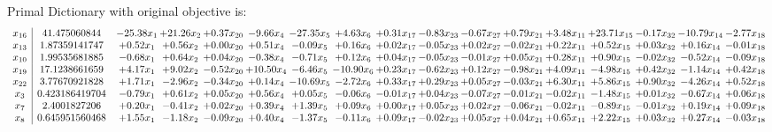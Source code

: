 \documentclass[9pt]{article}
\begin{document}
Primal Dictionary with original objective is:
\[\begin{array}{c| c c@{\hskip 2pt} c@{\hskip 2pt} c@{\hskip 2pt} c@{\hskip 2pt} c@{\hskip 2pt} c@{\hskip 2pt} c@{\hskip 2pt} c@{\hskip 2pt} c@{\hskip 2pt} c@{\hskip 2pt} c@{\hskip 2pt} c@{\hskip 2pt} c@{\hskip 2pt} c@{\hskip 2pt} c@{\hskip 2pt} }
 x_{16}   &  41.475060844 & -25.38 x_{1} & + 21.26 x_{2} & +  0.37 x_{20} & -9.66 x_{4} & -27.35 x_{5} & +  4.63 x_{6} & +  0.31 x_{17} & -0.83 x_{23} & -0.67 x_{27} & +  0.79 x_{21} & +  3.48 x_{11} & + 23.71 x_{15} & -0.17 x_{32} & -10.79 x_{14} & -2.77 x_{18}\\
 x_{13}   &  1.87359141747 & +  0.52 x_{1} & +  0.56 x_{2} & +  0.00 x_{20} & +  0.51 x_{4} & -0.09 x_{5} & +  0.16 x_{6} & +  0.02 x_{17} & -0.05 x_{23} & +  0.02 x_{27} & -0.02 x_{21} & +  0.22 x_{11} & +  0.52 x_{15} & +  0.03 x_{32} & +  0.16 x_{14} & -0.01 x_{18}\\
 x_{10}   &  1.99535681885 & -0.68 x_{1} & +  0.64 x_{2} & +  0.04 x_{20} & -0.38 x_{4} & -0.71 x_{5} & +  0.12 x_{6} & +  0.04 x_{17} & -0.05 x_{23} & -0.01 x_{27} & +  0.05 x_{21} & +  0.28 x_{11} & +  0.90 x_{15} & -0.02 x_{32} & -0.52 x_{14} & -0.09 x_{18}\\
 x_{19}   &  17.1238661659 & +  4.17 x_{1} & +  9.02 x_{2} & -0.52 x_{20} & + 10.50 x_{4} & -6.46 x_{5} & -10.90 x_{6} & +  0.23 x_{17} & -0.62 x_{23} & +  0.12 x_{27} & -0.98 x_{21} & +  4.09 x_{11} & -4.98 x_{15} & +  0.42 x_{32} & -1.14 x_{14} & +  0.42 x_{18}\\
 x_{22}   &  3.77670921828 & +  1.71 x_{1} & -2.96 x_{2} & -0.34 x_{20} & +  0.14 x_{4} & -10.69 x_{5} & -2.72 x_{6} & +  0.33 x_{17} & +  0.29 x_{23} & +  0.05 x_{27} & -0.03 x_{21} & +  6.30 x_{11} & +  5.86 x_{15} & +  0.90 x_{32} & -4.26 x_{14} & +  0.52 x_{18}\\
 x_{3}   &  0.423186419704 & -0.79 x_{1} & +  0.61 x_{2} & +  0.05 x_{20} & +  0.56 x_{4} & +  0.05 x_{5} & -0.06 x_{6} & -0.01 x_{17} & +  0.04 x_{23} & -0.07 x_{27} & -0.01 x_{21} & -0.02 x_{11} & -1.48 x_{15} & +  0.01 x_{32} & -0.67 x_{14} & +  0.06 x_{18}\\
 x_{7}   &  2.4001827206 & +  0.20 x_{1} & -0.41 x_{2} & +  0.02 x_{20} & +  0.39 x_{4} & +  1.39 x_{5} & +  0.09 x_{6} & +  0.00 x_{17} & +  0.05 x_{23} & +  0.02 x_{27} & -0.06 x_{21} & -0.02 x_{11} & -0.89 x_{15} & -0.01 x_{32} & +  0.19 x_{14} & +  0.09 x_{18}\\
 x_{8}   &  0.645951560468 & +  1.55 x_{1} & -1.18 x_{2} & -0.09 x_{20} & +  0.40 x_{4} & -1.37 x_{5} & -0.11 x_{6} & +  0.09 x_{17} & -0.02 x_{23} & +  0.05 x_{27} & +  0.04 x_{21} & +  0.65 x_{11} & +  2.22 x_{15} & +  0.03 x_{32} & +  0.27 x_{14} & -0.03 x_{18}\\

\end{array}\]
\end{document}
